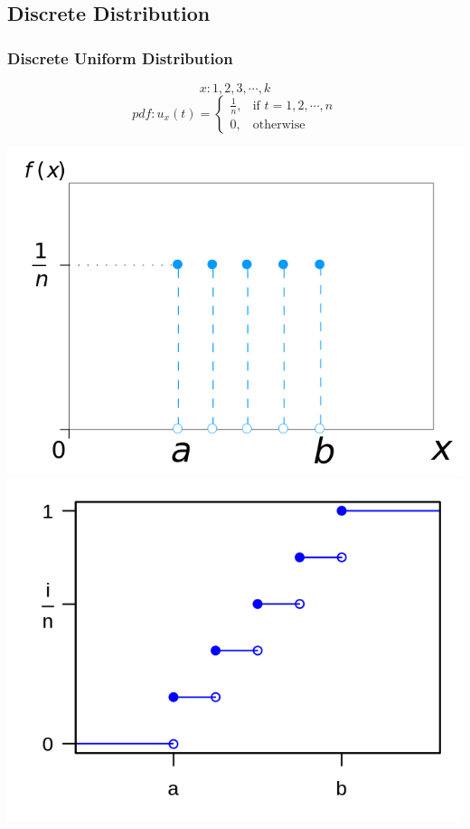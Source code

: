 \documentclass{article}
\begin{document}
{    \subsection{Discrete Distribution}{
        \subsubsection{Discrete Uniform Distribution}{
            \[ x: 1,2,3, \cdots, k\]
            \[ pdf: u_x(t)= \begin{cases} 
                \frac{1}{n}, & \text{if } t=1, 2,  \cdots, n \\
                0, & \text{otherwise} 
            \end{cases}\]
            \begin{center}{
                \includegraphics[scale=0.25]{Dis_Uniform_distribution_pdf.png}\includegraphics[scale=0.25]{Dis_Uniform_distribution_CDF.png}
            }
            \end{center}
        }
}}
\end{document}
